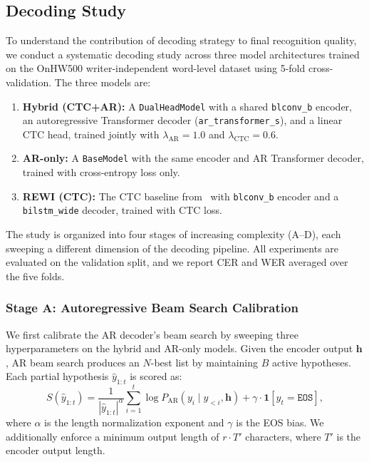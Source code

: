 %


\subsection{Decoding Study}
\label{sec:decode-study}

To understand the contribution of decoding strategy to final recognition quality,
we conduct a systematic decoding study across three model architectures trained
on the OnHW500 writer-independent word-level dataset using 5-fold cross-validation.
The three models are:
\begin{enumerate}[nosep]
    \item \textbf{Hybrid (CTC+AR):} A \texttt{DualHeadModel} with a shared \texttt{blconv\_b} encoder, an autoregressive Transformer decoder (\texttt{ar\_transformer\_s}), and a linear CTC head, trained jointly with $\lambda_\text{AR}=1.0$ and $\lambda_\text{CTC}=0.6$.
    \item \textbf{AR-only:} A \texttt{BaseModel} with the same encoder and AR Transformer decoder, trained with cross-entropy loss only.
    \item \textbf{REWI (CTC):} The CTC baseline from~\cite{li2025rewi} with \texttt{blconv\_b} encoder and a \texttt{bilstm\_wide} decoder, trained with CTC loss.
\end{enumerate}

\noindent
The study is organized into four stages of increasing complexity (A--D), each sweeping a different dimension of the decoding pipeline.
All experiments are evaluated on the validation split, and we report CER and WER averaged over the five folds.


\subsubsection{Stage A: Autoregressive Beam Search Calibration}
\label{sec:decode-stage-a}

We first calibrate the AR decoder's beam search by sweeping three hyperparameters on the hybrid and AR-only models.
Given the encoder output $\mathbf{h}$, AR beam search produces an $N$-best list by maintaining $B$ active hypotheses.
Each partial hypothesis $\hat{y}_{1:t}$ is scored as:
\begin{equation}
    S(\hat{y}_{1:t}) = \frac{1}{|\hat{y}_{1:t}|^{\alpha}} \sum_{i=1}^{t} \log P_\text{AR}(y_i \mid y_{<i}, \mathbf{h}) + \gamma \cdot \mathbf{1}[y_t = \texttt{EOS}],
    \label{eq:ar-beam-score}
\end{equation}
where $\alpha$ is the length normalization exponent and $\gamma$ is the EOS bias.
We additionally enforce a minimum output length of $r \cdot T'$ characters, where $T'$ is the encoder output length.

